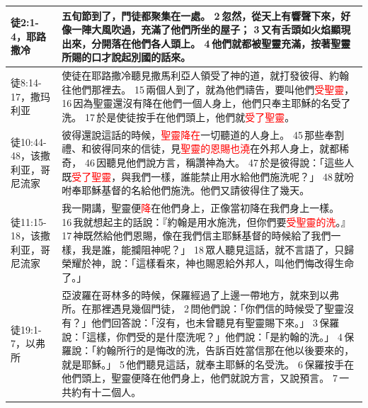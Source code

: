 \begin{table}[H]
\begin{tabular}{p{6em}|p{40em}}
徒2:1-4，耶路撒冷&五旬節到了，門徒都聚集在一處。 2 忽然，從天上有響聲下來，好像一陣大風吹過，充滿了他們所坐的屋子； 3 又有舌頭如火焰顯現出來，分開落在他們各人頭上。 4 他們就都被聖靈充滿，按著聖靈所賜的口才說起別國的話來。\\  \midrule
徒8:14-17，撒玛利亚&使徒在耶路撒冷聽見撒馬利亞人領受了神的道，就打發彼得、約翰往他們那裡去。 15 兩個人到了，就為他們禱告，要叫他們\textcolor{red}{受聖靈}， 16 因為聖靈還沒有降在他們一個人身上，他們只奉主耶穌的名受了洗。 17 於是使徒按手在他們頭上，他們就\textcolor{red}{受了聖靈}。\\  \midrule
徒10:44-48，该撒利亚，哥尼流家&彼得還說這話的時候，\textcolor{red}{聖靈降在}一切聽道的人身上。 45 那些奉割禮、和彼得同來的信徒，見\textcolor{red}{聖靈的恩賜也澆}在外邦人身上，就都稀奇， 46 因聽見他們說方言，稱讚神為大。 47 於是彼得說：「這些人既\textcolor{red}{受了聖靈}，與我們一樣，誰能禁止用水給他們施洗呢？」 48 就吩咐奉耶穌基督的名給他們施洗。他們又請彼得住了幾天。\\  \midrule
徒11:15-18，该撒利亚，哥尼流家&我一開講，聖靈便\textcolor{red}{降}在他們身上，正像當初降在我們身上一樣。 16 我就想起主的話說：『約翰是用水施洗，但你們要\textcolor{red}{受聖靈的洗}。』 17 神既然給他們恩賜，像在我們信主耶穌基督的時候給了我們一樣，我是誰，能攔阻神呢？」 18 眾人聽見這話，就不言語了，只歸榮耀於神，說：「這樣看來，神也賜恩給外邦人，叫他們悔改得生命了。」\\  \midrule
徒19:1-7，以弗所&亞波羅在哥林多的時候，保羅經過了上邊一帶地方，就來到以弗所。在那裡遇見幾個門徒， 2 問他們說：「你們信的時候受了聖靈沒有？」他們回答說：「沒有，也未曾聽見有聖靈賜下來。」 3 保羅說：「這樣，你們受的是什麼洗呢？」他們說：「是約翰的洗。」 4 保羅說：「約翰所行的是悔改的洗，告訴百姓當信那在他以後要來的，就是耶穌。」 5 他們聽見這話，就奉主耶穌的名受洗。 6 保羅按手在他們頭上，聖靈便降在他們身上，他們就說方言，又說預言。 7 一共約有十二個人。\\  \midrule
\end{tabular}
\end{table}

